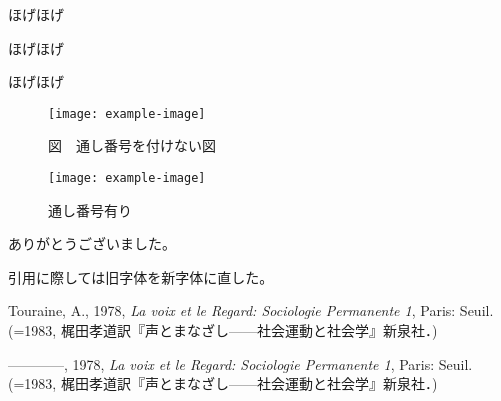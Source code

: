 \documentclass[]{sociologos}
\begin{document}
ほげほげ

ほげほげ

ほげほげ


\begin{figure}[!htbp]
\centering
\noindent
\begin{minipage}{.47\textwidth}
  \centering
  \texttt{[image: example-image]}
  \caption*{図　通し番号を付けない図}
\end{minipage}
\hfill
\begin{minipage}{.47\textwidth}
  \centering
  \texttt{[image: example-image]}
  \caption{通し番号有り}
\end{minipage}
\end{figure}


\begin{ackn} %
ありがとうございました。
\end{ackn}

\begin{huki} %
引用に際しては旧字体を新字体に直した。
\end{huki}

\theendnotes %

\begin{references}
Touraine, A., 1978, \emph{La voix et le Regard: Sociologie Permanente 1}, Paris: Seuil. (=1983, 梶田孝道訳『声とまなざし------社会運動と社会学』新泉社．)

------------, 1978, \emph{La voix et le Regard: Sociologie Permanente 1}, Paris: Seuil. (=1983, 梶田孝道訳『声とまなざし------社会運動と社会学』新泉社．)
\end{references}

\credits %

\makeenglishtitle %
\end{document}
